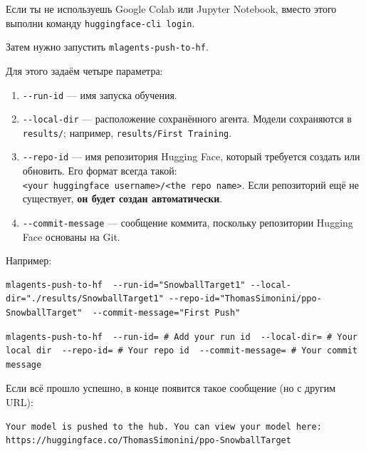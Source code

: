 \documentclass[11pt,a4paper]{article}
\begin{document}
Если ты не используешь Google Colab или Jupyter Notebook, вместо этого выполни команду \texttt{huggingface-cli\ login}.

Затем нужно запустить \texttt{mlagents-push-to-hf}.

Для этого задаём четыре параметра:

\begin{enumerate}
\def\labelenumi{\arabic{enumi}.}
\item
  \texttt{-\/-run-id} --- имя запуска обучения.
\item
  \texttt{-\/-local-dir} --- расположение сохранённого агента. Модели сохраняются в \texttt{results/}; например, \texttt{results/First\ Training}.
\item
  \texttt{-\/-repo-id} --- имя репозитория Hugging Face, который требуется создать или обновить. Его формат всегда такой: \texttt{\textless{}your\ huggingface\ username\textgreater{}/\textless{}the\ repo\ name\textgreater{}}. Если репозиторий ещё не существует, \textbf{он будет создан автоматически}.
\item
  \texttt{-\/-commit-message} --- сообщение коммита, поскольку репозитории Hugging Face основаны на Git.
\end{enumerate}


Например:

\begin{lstlisting}
mlagents-push-to-hf  --run-id="SnowballTarget1" --local-dir="./results/SnowballTarget1" --repo-id="ThomasSimonini/ppo-SnowballTarget"  --commit-message="First Push"
\end{lstlisting}

\begin{lstlisting}
mlagents-push-to-hf  --run-id= # Add your run id  --local-dir= # Your local dir  --repo-id= # Your repo id  --commit-message= # Your commit message
\end{lstlisting}

Если всё прошло успешно, в конце появится такое сообщение (но с другим URL):

\begin{lstlisting}
Your model is pushed to the hub. You can view your model here: https://huggingface.co/ThomasSimonini/ppo-SnowballTarget
\end{lstlisting}
\end{document}
